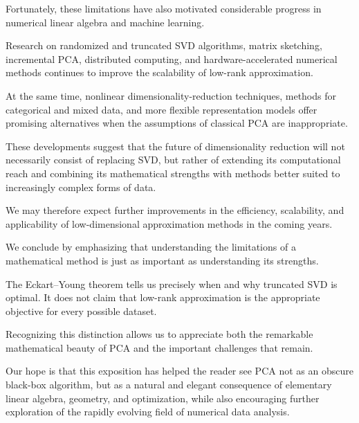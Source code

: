\documentclass[11pt]{article}
\begin{document}
Fortunately, these limitations have
also motivated considerable progress
in numerical linear algebra and
machine learning.

Research on randomized and truncated
SVD algorithms, matrix sketching,
incremental PCA, distributed computing,
and hardware-accelerated numerical
methods continues to improve the
scalability of low-rank approximation.

At the same time, nonlinear
dimensionality-reduction techniques,
methods for categorical and mixed
data, and more flexible representation
models offer promising alternatives
when the assumptions of classical
PCA are inappropriate.

These developments suggest that the
future of dimensionality reduction
will not necessarily consist of
replacing SVD, but rather of extending
its computational reach and combining
its mathematical strengths with methods
better suited to increasingly complex
forms of data.

We may therefore expect further
improvements in the efficiency,
scalability, and applicability
of low-dimensional approximation
methods in the coming years.

We conclude by emphasizing that
understanding the limitations of
a mathematical method is just as
important as understanding its
strengths.

The Eckart--Young theorem tells us
precisely when and why truncated
SVD is optimal. It does not claim
that low-rank approximation is
the appropriate objective for
every possible dataset.

Recognizing this distinction allows
us to appreciate both the remarkable
mathematical beauty of PCA and the
important challenges that remain.

Our hope is that this exposition
has helped the reader see PCA not
as an obscure black-box algorithm,
but as a natural and elegant
consequence of elementary linear
algebra, geometry, and optimization,
while also encouraging further
exploration of the rapidly evolving
field of numerical data analysis.


\end{document}
